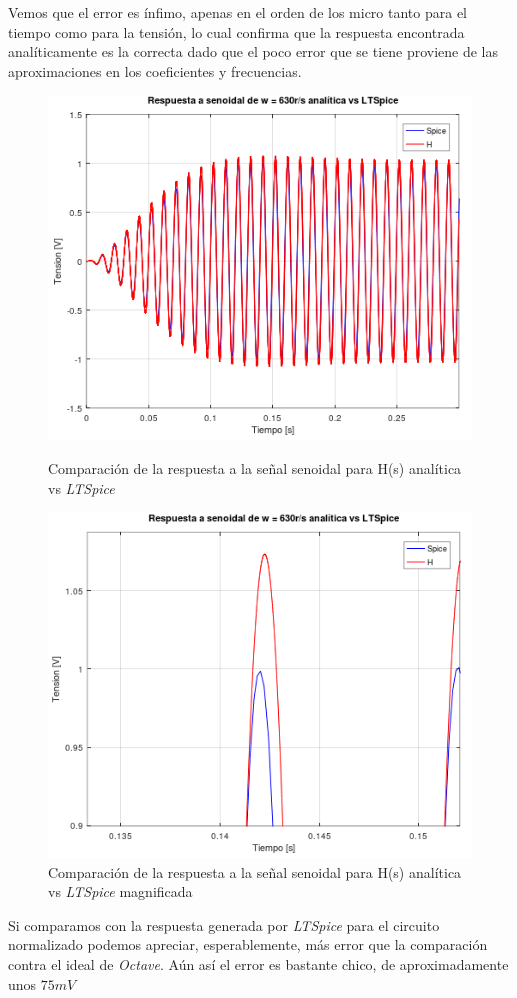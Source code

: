 \documentclass[11pt,a4paper]{report}
\begin{document}
Vemos que el error es ínfimo, apenas en el orden de los micro tanto para el tiempo como para la tensión, lo cual confirma que la respuesta encontrada analíticamente es la correcta dado que el poco error que se tiene proviene de las aproximaciones en los coeficientes y frecuencias.
\clearpage

\begin{figure}[ht!]
\centering
\includegraphics[scale=1]{rtaSenoidalAnaliticavsSpice.png}
\caption{Comparación de la respuesta a la señal senoidal para H(s) analítica vs \textit{LTSpice}}
\includegraphics[scale=0.9]{rtaSenoidalAnaliticavsSpiceMagnificada.png}
\caption{Comparación de la respuesta a la señal senoidal para H(s) analítica vs \textit{LTSpice} magnificada}
\end{figure}
\clearpage

Si comparamos con la respuesta generada por \textit{LTSpice} para el circuito normalizado podemos apreciar, esperablemente, más error que la comparación contra el ideal de \textit{Octave}. Aún así el error es bastante chico, de aproximadamente unos $75mV$
\end{document}
